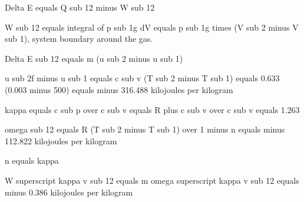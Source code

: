 Delta E equals Q sub 12 minus W sub 12

W sub 12 equals integral of p sub 1g dV equals p sub 1g times (V sub 2 minus V sub 1), system boundary around the gas.

Delta E sub 12 equals m (u sub 2 minus u sub 1)

u sub 2f minus u sub 1 equals c sub v (T sub 2 minus T sub 1) equals 0.633 (0.003 minus 500) equals minus 316.488 kilojoules per kilogram

kappa equals c sub p over c sub v equals R plus c sub v over c sub v equals 1.263

omega sub 12 equals R (T sub 2 minus T sub 1) over 1 minus n equals minus 112.822 kilojoules per kilogram

n equals kappa

W superscript kappa v sub 12 equals m omega superscript kappa v sub 12 equals minus 0.386 kilojoules per kilogram